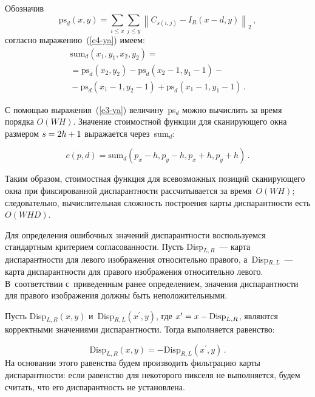 \begin{multicols}{2}
    Обозначив 
  $$
  \mathrm{ps}_d(x,y)= \sum\limits_{i\leq x} \sum\limits_{j\leq y} \left\| 
C_{s(i,j)} - I_R (x- d, y)\right\|_2\,,
$$
 согласно выражению~(\ref{e4-ya})  имеем:
  \begin{multline*}
  \mathrm{sum}_d\left( x_1, y_1, x_2, y_2\right) ={}\\
  {}= \mathrm{ps}_d\left( x_2, y_2\right)  - \mathrm{ps}_d\left( x_2-
1, y_1-1\right) - {}\\
{}-\mathrm{ps}_d \left( x_1-1, y_2-1\right) +\mathrm{ps}_d \left( x_1-1, y_1-1\right)\,.
  \end{multline*}
  
  С помощью выражения~(\ref{e3-ya}) величину~ps$_d$ можно вычислить за 
время порядка $O(W  H)$. Значение стоимостной функции для 
сканирующего окна размером $s\hm= 2h\hm+1$ выражается через~sum$_d$:

\vspace*{2pt}

\noindent
  $$
  c(p,d) = \mathrm{sum}_d \left( p_x -h, p_y -h, p_x+h, p_y+h\right)\,.
  $$
  
  \vspace*{-2pt}
  
  Таким образом, стоимостная функция для всевозможных позиций 
сканирующего окна при фиксированной диспарантности рассчитывается за 
время~$O(W  H)$; следовательно, вычислительная сложность построения 
карты диспарантности есть $O(W H D)$.
  
  Для определения ошибочных значений диспарантности воспользуемся 
стандартным критерием согласованности. Пусть Disp$_{L,R}$~--- карта 
диспарантности для левого изображения относительно правого, 
а~Disp$_{R,L}$~--- карта диспарантности для правого изображения 
относительно левого. В~соответствии с~приведенным ранее определением, 
значения диспарантности для правого изображения должны быть 
неположительными.
  
  Пусть Disp$_{L,R}(x,y)$ и~Disp$_{R,L} (x^\prime, y)$, где $x^\prime \hm= 
x\hm- \mathrm{Disp}_{L,R}$, являются корректными значениями диспарантности. Тогда 
выполняется равенство:

\noindent
  $$
  \mathrm{Disp}_{L,R} (x,y) =- \mathrm{Disp}_{R,L}\left(x^\prime, y\right)\,.
  $$
На основании этого равенства будем производить фильтрацию карты 
диспарантности: если равенство  для некоторого пикселя не выполняется, будем 
считать, что его диспарантность не установлена.
\begin{table*}
{\small \begin{center}
\vspace*{2ex}


\end{center}}
\end{table*}
\end{multicols}
